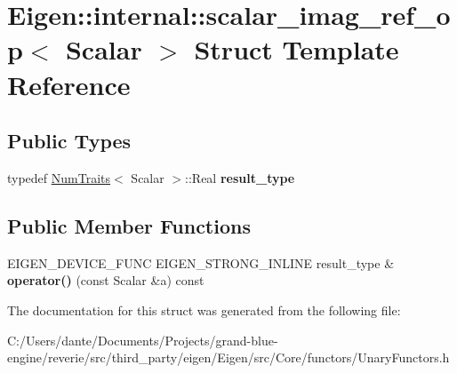\hypertarget{struct_eigen_1_1internal_1_1scalar__imag__ref__op}{}\section{Eigen\+::internal\+::scalar\+\_\+imag\+\_\+ref\+\_\+op$<$ Scalar $>$ Struct Template Reference}
\label{struct_eigen_1_1internal_1_1scalar__imag__ref__op}
\subsection*{Public Types}
\begin{DoxyCompactItemize}
\item 
\mbox{\label{struct_eigen_1_1internal_1_1scalar__imag__ref__op_a0b0205a8cc554c1be5ed7599e9922e7b}} 
typedef \mbox{\hyperlink{struct_eigen_1_1_num_traits}{Num\+Traits}}$<$ Scalar $>$\+::Real {\bfseries result\+\_\+type}
\end{DoxyCompactItemize}
\subsection*{Public Member Functions}
\begin{DoxyCompactItemize}
\item 
\mbox{\label{struct_eigen_1_1internal_1_1scalar__imag__ref__op_ad4b4a42cb29dd73505f747dab138ee45}} 
E\+I\+G\+E\+N\+\_\+\+D\+E\+V\+I\+C\+E\+\_\+\+F\+U\+NC E\+I\+G\+E\+N\+\_\+\+S\+T\+R\+O\+N\+G\+\_\+\+I\+N\+L\+I\+NE result\+\_\+type \& {\bfseries operator()} (const Scalar \&a) const
\end{DoxyCompactItemize}


The documentation for this struct was generated from the following file\+:\begin{DoxyCompactItemize}
\item 
C\+:/\+Users/dante/\+Documents/\+Projects/grand-\/blue-\/engine/reverie/src/third\+\_\+party/eigen/\+Eigen/src/\+Core/functors/Unary\+Functors.\+h\end{DoxyCompactItemize}
